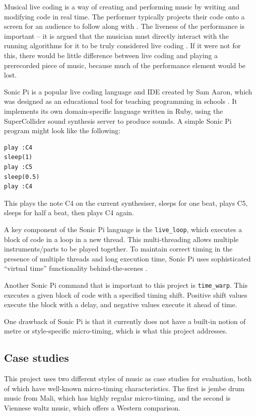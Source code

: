 \documentclass[12pt,twoside,openright]{report}
\begin{document}
Musical live coding is a way of creating and performing music by writing and
modifying code in real time. The performer typically projects their code onto a
screen for an audience to follow along with \cite{magnusson2011}. The liveness of the
performance is important -- it is argued that the musician must directly
interact with the running algorithms for it to be truly considered live coding
\cite{collins2011}. If it were not for this, there would be little difference between live coding and playing a prerecorded piece of music, because much of the performance element would be lost.

Sonic Pi is a popular live coding language and IDE created by Sam Aaron, which
was designed as an educational tool for teaching programming in schools \cite{aaron2013}. It
implements its own domain-specific language written in Ruby, using the
SuperCollider sound synthesis server to produce sounds. A simple
Sonic Pi program might look like the following:

\begin{verbatim}
play :C4
sleep(1)
play :C5
sleep(0.5)
play :C4
\end{verbatim}

This plays the note C4 on the current synthesiser, sleeps for one beat, plays C5,
sleeps for half a beat, then plays C4 again.

A key component of the Sonic Pi language is the \verb'live_loop', which executes a
block of code in a loop in a new thread. This multi-threading allows multiple instruments/parts to be played together. To maintain correct timing in the presence
of multiple threads and long execution time, Sonic Pi uses sophisticated
``virtual time'' functionality behind-the-scenes \cite{aaron2014}.

Another Sonic Pi command that is important to this project is \verb'time_warp'. This executes a given block of code with a specified timing shift. Positive shift values execute the block with a delay, and negative values execute it ahead of time.

One drawback of Sonic Pi is that it currently does not have a built-in notion of
metre or style-specific micro-timing, which is what this project addresses.


\subsection{Case studies} \label{case_studies}

This project uses two different styles of music as case studies for evaluation,
both of which have well-known micro-timing characteristics. The first is jembe
drum music from Mali, which has highly regular micro-timing, and the second is
Viennese waltz music, which offers a Western comparison.
\end{document}
